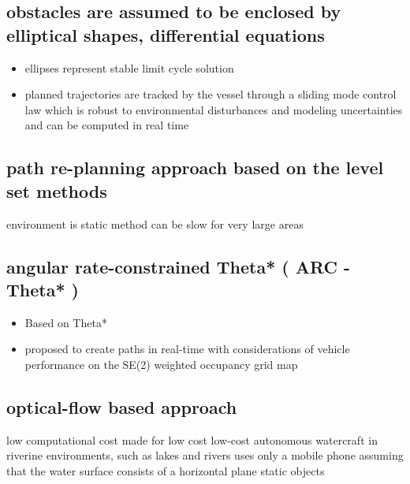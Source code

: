 \subsection{obstacles are assumed to be enclosed by elliptical shapes, differential equations } \cite{soltan2009trajectory}
\begin{itemize}
    \con obstacles approximated as elliptic shapes
    \con Focuses mostly on under-actuated unmanned surface vessels
    \con Does not mention COLREG
    \pro  only the current information about the obstacles and the target are required for real-time trajectory planning
    \item ellipses represent stable limit cycle solution
    \item planned trajectories are tracked by the vessel through a sliding mode control law which is robust to environmental  disturbances  and  modeling uncertainties and can be computed in real time
\end{itemize}
\subsection{path re-planning approach based on the level set methods }\cite{xu2013fast}
\begin{itemize}
    \con environment is static
    \con method can be slow for very large areas
\end{itemize}
\subsection{angular rate-constrained  Theta* ( ARC - Theta* )  }\cite{kim2014angular}
\begin{itemize}
    \con Does not consider colreg atm (future work)
    \pro  considering both angular rate (yaw rate) and heading angle of unmanned surface vehicles (USVs)
    \item Based on Theta*
    \item  proposed to create paths in real-time with considerations of vehicle performance on the SE(2) weighted occupancy grid map
\end{itemize}
\subsection{optical-flow based approach }\cite{el2013visual}
\begin{itemize}
    \pro low computational cost
    \con made for low cost low-cost autonomous watercraft in riverine environments, such as lakes and rivers
    \con uses only a mobile phone
    \con assuming that the water surface consists of a horizontal plane
    \con static objects
\end{itemize}

